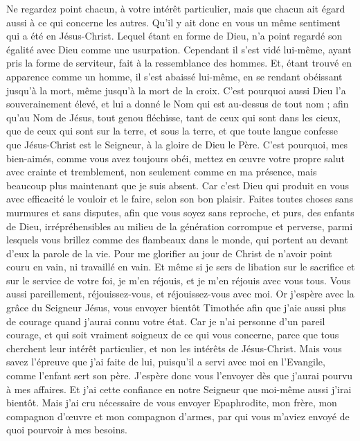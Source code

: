 \begin{multicols}{2}
Ne regardez point chacun, à votre intérêt particulier, mais que chacun ait égard aussi à ce qui concerne les autres.
Qu'il y ait donc en vous un même sentiment qui a été en Jésus-Christ. 
Lequel étant en forme de Dieu, n'a point regardé son égalité avec Dieu comme une usurpation.
Cependant il s'est vidé lui-même, ayant pris la forme de serviteur, fait à la ressemblance des hommes.
Et, étant trouvé en apparence comme un homme, il s'est abaissé lui-même, en se rendant obéissant jusqu'à la mort, même jusqu'à la mort de la croix. 
C'est pourquoi aussi Dieu l'a souverainement élevé, et lui a donné le Nom qui est au-dessus de tout nom ;
afin qu'au Nom de Jésus, tout genou fléchisse, tant de ceux qui sont dans les cieux, que de ceux qui sont sur la terre, et sous la terre,
et que toute langue confesse que Jésus-Christ est le Seigneur, à la gloire de Dieu le Père.
C'est pourquoi, mes bien-aimés, comme vous avez toujours obéi, mettez en œuvre votre propre salut avec crainte et tremblement, non seulement comme en ma présence, mais beaucoup plus maintenant que je suis absent.
Car c'est Dieu qui produit en vous avec efficacité le vouloir et le faire, selon son bon plaisir.
Faites toutes choses sans murmures et sans disputes,
afin que vous soyez sans reproche, et purs, des enfants de Dieu, irrépréhensibles au milieu de la génération corrompue et perverse, parmi lesquels vous brillez comme des flambeaux dans le monde, qui portent au devant d'eux la parole de la vie. 
Pour me glorifier au jour de Christ de n'avoir point couru en vain, ni travaillé en vain. 
Et même si je sers de libation sur le sacrifice et sur le service de votre foi, je m'en réjouis, et je m'en réjouis avec vous tous.
Vous aussi pareillement, réjouissez-vous, et réjouissez-vous avec moi.
Or j'espère avec la grâce du Seigneur Jésus, vous envoyer bientôt Timothée afin que j'aie aussi plus de courage quand j'aurai connu votre état. 
Car je n'ai personne d'un pareil courage, et qui soit vraiment soigneux de ce qui vous concerne,
parce que tous cherchent leur intérêt particulier, et non les intérêts de Jésus-Christ. 
Mais vous savez l'épreuve que j'ai faite de lui, puisqu'il a servi avec moi en l'Evangile, comme l'enfant sert son père.
J'espère donc vous l'envoyer dès que j'aurai pourvu à mes affaires.
Et j'ai cette confiance en notre Seigneur que moi-même aussi j'irai bientôt.
Mais j'ai cru nécessaire de vous envoyer Epaphrodite, mon frère, mon compagnon d'œuvre et mon compagnon d'armes, par qui vous m'aviez envoyé de quoi pourvoir à mes besoins.

\end{multicols}
